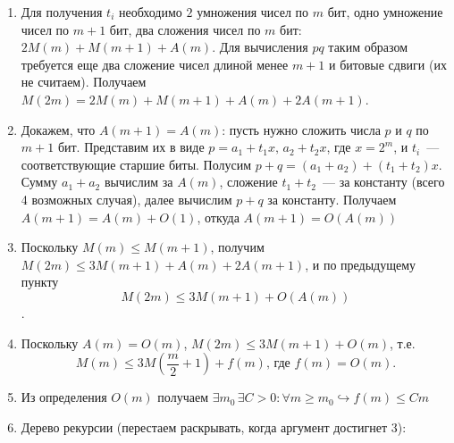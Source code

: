 \documentclass[a4paper]{article}
\begin{document}
\begin{enumerate}
\item Для получения $t_i$ необходимо $2$ умножения чисел по $m$ бит, одно умножение чисел по $m+1$ бит, два сложения чисел по $m$ бит: $2M(m)+M(m+1)+A(m)$. Для вычисления $pq$ таким образом требуется еще два сложение чисел длиной менее $m+1$ и битовые сдвиги (их не считаем). Получаем $M(2m)=2M(m)+M(m+1)+A(m)+2A(m+1)$.
\item Докажем, что $A(m+1)=A(m)$: пусть нужно сложить числа $p$ и $q$ по $m+1$ бит. Представим их в виде $p=a_1+t_1x,\,a_2+t_2x$, где $x=2^m$, и $t_i$~--- соответствующие старшие биты. Полусим $p+q=(a_1+a_2)+(t_1+t_2)x$. Сумму $a_1+a_2$ вычислим за $A(m)$, сложение $t_1+t_2$~--- за константу (всего 4 возможных случая), далее вычислим $p+q$ за константу. Получаем $A(m+1)=A(m)+O(1)$, откуда $A(m+1)=O(A(m))$
\item Поскольку $M(m)\leqslant M(m+1)$, получим $M(2m)\leqslant 3M(m+1)+A(m)+2A(m+1)$, и по предыдущему пункту $$M(2m)\leqslant 3M(m+1)+O(A(m))$$.
\item Поскольку $A(m)=O(m)$, $M(2m)\leqslant 3M(m+1)+O(m)$, т.е. $$M(m)\leqslant 3M(\frac{m}{2}+1)+f(m)\mbox{, где }f(m)=O(m).$$
\item Из определения $O(m)$ получаем $\exists m_0\,\exists C>0\colon\forall m\geqslant m_0\hookrightarrow f(m)\leqslant Cm$
\item Дерево рекурсии (перестаем раскрывать, когда аргумент достигнет 3):\newline
{}
\end{enumerate}
\end{document}
